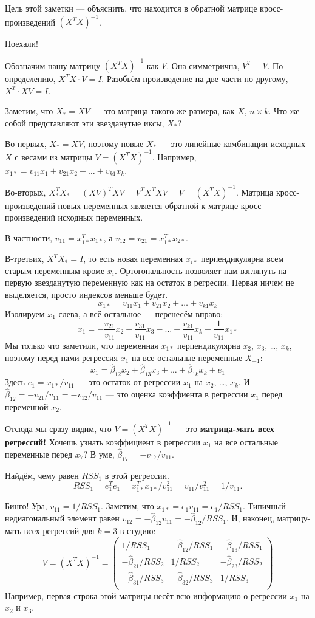 \documentclass[12pt]{article}
\newcommand{\hb}{\hat{\beta}}
\begin{document}
Цель этой заметки — объяснить, что находится в обратной матрице кросс-произведений $(X^TX)^{-1}$.

Поехали! 

Обозначим нашу матрицу $(X^TX)^{-1}$ как $V$. Она симметрична, $V^T = V$. 
По определению, $X^TX \cdot V = I$.
Разобьём произведение на две части по-другому, $X^T \cdot XV = I$.

Заметим, что $X_* = XV$ — это матрица такого же размера, как $X$, $n\times k$. 
Что же собой представляют эти звезданутые иксы, $X_*$?

Во-первых, $X_* = XV$, поэтому новые $X_*$ — это линейные комбинации исходных $X$ с весами из матрицы $V = (X^TX)^{-1}$.
Например, $x_{1*} = v_{11} x_1 + v_{21} x_2 + \dots + v_{k1} x_k$.

Во-вторых, $X_*^T X_* = (X V)^T   X V = V^T X^TX V = V = (X^TX)^{-1}$. 
Матрица кросс-произведений новых переменных является обратной к матрице кросс-произведений исходных переменных. 

В частности, $v_{11} = x_{1*}^T x_{1*}$, а $v_{12} = v_{21} = x_{1*}^T x_{2*}$.

В-третьих, $X^TX_* = I$, то есть новая переменная $x_{i*}$ перпендикулярна всем старым переменным кроме $x_i$.
Ортогональность позволяет нам взглянуть на первую звезданутую переменную как на остаток в регресии.
Первая ничем не выделяется, просто индексов меньше будет.
\[
x_{1*} = v_{11} x_1 + v_{21} x_2 + \dots + v_{k1} x_k 
\]
Изолируем $x_1$ слева, а всё остальное — перенесём вправо:
\[
x_1 = -\frac{v_{21}}{v_{11}} x_2  -\frac{v_{31}}{v_{11}} x_3 - \dots -\frac{v_{k1}}{v_{11}} x_k + \frac{1}{v_{11}} x_{1*} 
\]
Мы только что заметили, что переменная $x_{1*}$ перпендикулярна $x_2$, $x_3$, \dots, $x_k$, поэтому перед нами регрессия $x_1$ на все остальные переменные $X_{-1}$:
\[
x_1 = \hb_{12} x_2 + \hb_{13} x_3 + \dots + \hb_{1k} x_k + e_1
\]
Здесь $e_1 = x_{1*} /v_{11}$ — это остаток от регрессии $x_1$ на $x_2$, \dots, $x_k$.
И $\hb_{12} = -{v_{21}}/{v_{11}} = -{v_{12}}/{v_{11}}$ — это оценка коэффиента в регрессии $x_1$ перед переменной $x_2$.

Отсюда мы сразу видим, что $V = (X^TX)^{-1}$ — это \textbf{матрица-мать всех регрессий!}
Хочешь узнать коэффициент в регрессии $x_1$ на все остальные переменные перед $x_7$?
В уме, $\hb_{17} = - v_{17} / v_{11}$.


Найдём, чему равен $RSS_1$ в этой регрессии.
\[
RSS_1 = e_1^T e_1 = x_{1*}^T x_{1*} / v_{11}^2  = v_{11} / v_{11}^2 = 1  / v_{11}.
\]

Бинго! Ура, $v_{11} = 1/ RSS_1$. 
Заметим, что $x_{1*} = e_1 v_{11} = e_1/RSS_1$.
Типичный недиагональный элемент равен $v_{12} = -\hb_{12} v_{11} = -\hb_{12}/RSS_1$.
И, наконец, матрицу-мать всех регрессий для $k=3$ в студию:
\[
V = (X^TX)^{-1} = \begin{pmatrix}
    1/RSS_1 & -{\hb_{12}}/{RSS_1} & -{\hb_{13}}/{RSS_1}\\
    - {\hb_{21}}/{RSS_2} & 1/RSS_2 & - {\hb_{23}}/{RSS_2} \\
    - {\hb_{31}}/{RSS_3}  & - {\hb_{32}}/{RSS_3} & 1/RSS_3 \\
\end{pmatrix} 
\]
Например, первая строка этой матрицы несёт всю информацию о регрессии $x_1$ на $x_2$ и $x_3$.
\end{document}
